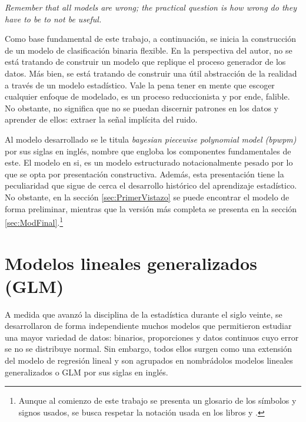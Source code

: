 \documentclass[../Main/Main.tex]{subfiles}
\begin{document}
\epigraph{\textit{Remember that all models are wrong; the practical question is how wrong do they have to be to not be useful.}}{\citet{box1976science}}

Como base fundamental de este trabajo, a continuación, se inicia la construcción de un modelo de clasificación binaria flexible. En la perspectiva del autor, no se está tratando de construir un modelo que replique el proceso generador de los datos. Más bien, se está tratando de construir una útil abstracción de la realidad a través de un modelo estadístico. Vale la pena tener en mente que escoger cualquier enfoque de modelado, es un proceso reduccionista y por ende, falible. No obstante, no significa que no se puedan discernir patrones en los datos y aprender de ellos: extraer la señal implícita del ruido.

Al modelo desarrollado se le titula \textit{bayesian piecewise polynomial model (bpwpm)} por sus siglas en inglés, nombre que engloba los componentes fundamentales de este. El modelo en si, es un modelo estructurado notacionalmente pesado por lo que se opta por presentación constructiva. Además, esta presentación tiene la peculiaridad que sigue de cerca el desarrollo histórico del aprendizaje estadístico. No obstante, en la sección \ref{sec:PrimerVistazo} se puede encontrar el modelo de forma preliminar, mientras que la versión más completa se presenta en la sección \ref{sec:ModFinal}.\footnote{Aunque al comienzo de este trabajo se presenta un glosario de los símbolos y signos usados, se busca respetar la notación usada en los libros \citet{hastie2008elements} y \citet{james2013introduction}.}

\section{Modelos lineales generalizados (GLM)} \label{sec:GLM}
A medida que avanzó la disciplina de la estadística durante el siglo veinte, se desarrollaron de forma independiente muchos modelos que permitieron estudiar una mayor variedad de datos: binarios, proporciones y datos continuos cuyo error se no se distribuye normal. Sin embargo, todos ellos surgen como una extensión del modelo de regresión lineal y son agrupados en \citet{maccullagh1989generalized} nombrádolos modelos lineales generalizados o GLM por sus siglas en inglés. 
\end{document}
